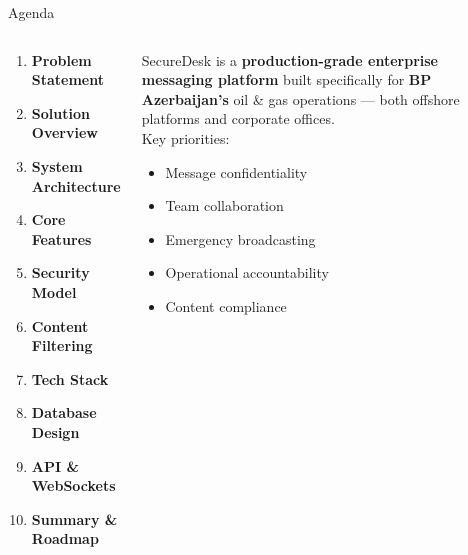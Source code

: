 \documentclass[aspectratio=169,12pt]{beamer}
\begin{document}
\begin{frame}{Agenda}
\begin{columns}[t]
\begin{tcolorbox}[colback=SlideGray,colframe=BPDark,arc=6pt,boxrule=1pt,
  title={\faList\ \textbf{Contents}},
  fonttitle=\bfseries\color{white},
  attach boxed title to top left={yshift=-2mm,xshift=4mm},
  boxed title style={colback=BPDark}]
\begin{enumerate}\setlength\itemsep{6pt}
  \item \textbf{Problem Statement}
  \item \textbf{Solution Overview}
  \item \textbf{System Architecture}
  \item \textbf{Core Features}
  \item \textbf{Security Model}
  \item \textbf{Content Filtering}
  \item \textbf{Tech Stack}
  \item \textbf{Database Design}
  \item \textbf{API \& WebSockets}
  \item \textbf{Summary \& Roadmap}
\end{enumerate}
\end{tcolorbox}

\begin{tcolorbox}[colback=BPLight,colframe=BPGreen,arc=6pt,boxrule=1pt,
  title={\faInfoCircle\ \textbf{About SecureDesk}},
  fonttitle=\bfseries\color{white},
  attach boxed title to top left={yshift=-2mm,xshift=4mm},
  boxed title style={colback=BPGreen}]
\small
SecureDesk is a \textbf{production-grade enterprise messaging platform}
built specifically for \textbf{BP Azerbaijan's} oil \& gas operations
--- both offshore platforms and corporate offices.\\[6pt]
Key priorities:
\begin{itemize}\setlength\itemsep{4pt}
  \item[\faLock] Message confidentiality
  \item[\faUsers] Team collaboration
  \item[\faBell] Emergency broadcasting
  \item[\faClipboard] Operational accountability
  \item[\faFilter] Content compliance
\end{itemize}
\end{tcolorbox}
\end{columns}
\end{frame}
\end{document}

